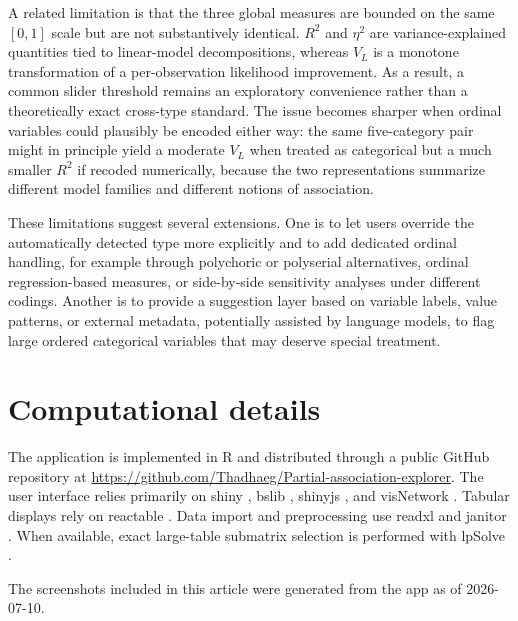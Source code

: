 \documentclass[11pt]{article}
\newcommand{\pkg}[1]{\textsf{#1}}
\newcommand{\proglang}[1]{\textsf{#1}}
\begin{document}
A related limitation is that the three global measures are bounded on the same
$[0,1]$ scale but are not substantively identical. $R^2$ and $\eta^2$ are
variance-explained quantities tied to linear-model decompositions, whereas
$V_L$ is a monotone transformation of a per-observation likelihood improvement.
As a result, a common slider threshold remains an exploratory convenience rather
than a theoretically exact cross-type standard. The issue becomes sharper when
ordinal variables could plausibly be encoded either way: the same five-category
pair might in principle yield a moderate $V_L$ when treated as categorical but
a much smaller $R^2$ if recoded numerically, because the two representations
summarize different model families and different notions of association.

These limitations suggest several extensions. One is to let users override the
automatically detected type more explicitly and to add dedicated ordinal
handling, for example through polychoric or polyserial alternatives, ordinal
regression-based measures, or side-by-side sensitivity analyses under different
codings. Another is to provide a suggestion layer based on variable labels,
value patterns, or external metadata, potentially assisted by language models,
to flag large ordered categorical variables that may deserve special treatment.

\section*{Computational details}

The application is implemented in \proglang{R} and distributed through a public
GitHub repository at
\url{https://github.com/Thadhaeg/Partial-association-explorer}. The user
interface relies primarily on \pkg{shiny} \citep{Shiny}, \pkg{bslib}
\citep{bslib}, \pkg{shinyjs} \citep{shinyjs}, and \pkg{visNetwork}
\citep{VisNetwork}. Tabular displays rely on \pkg{reactable}
\citep{reactable}. Data import and preprocessing use \pkg{readxl}
\citep{readxl} and \pkg{janitor} \citep{janitor}. When available, exact
large-table submatrix selection is performed with \pkg{lpSolve}
\citep{lpSolve}.

The screenshots included in this article were generated from the app as of
2026-07-10.
\end{document}
